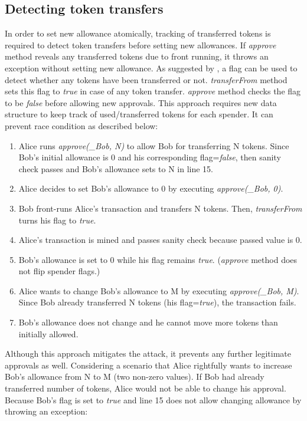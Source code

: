 \subsection{Detecting token transfers}
In order to set new allowance atomically, tracking of transferred tokens is required to detect token transfers before setting new allowances. If \textit{approve} method reveals any transferred tokens due to front running, it throws an exception without setting new allowance. As suggested by \cite{Ref17}, a flag can be used to detect whether any tokens have been transferred or not. \textit{transferFrom} method sets this flag to \textit{true} in case of any token transfer. \textit{approve} method checks the flag to be \textit{false} before allowing new approvals. This approach requires new data structure to keep track of used/transferred tokens for each spender. It can prevent race condition as described below:
\begin{enumerate}
	\item Alice runs \textit{approve(\_Bob, N)} to allow Bob for transferring N tokens. Since Bob’s initial allowance is 0 and his corresponding flag=\textit{false}, then sanity check passes and Bob’s allowance sets to N in line 15.
	\item Alice decides to set Bob’s allowance to 0 by executing \textit{approve(\_Bob, 0)}.
	\item Bob front-runs Alice’s transaction and transfers N tokens. Then, \textit{transferFrom} turns his flag to \textit{true}.
	\item Alice’s transaction is mined and passes sanity check because passed value is 0.
	\item Bob’s allowance is set to 0 while his flag remains \textit{true}. (\textit{approve} method does not flip spender flags.)
	\item Alice wants to change Bob’s allowance to M by executing \textit{approve(\_Bob, M)}. Since Bob already transferred N tokens (his flag=\textit{true}), the transaction fails.
	\item Bob’s allowance does not change and he cannot move more tokens than initially allowed.\newline
\end{enumerate}
\noindent Although this approach mitigates the attack, it prevents any further legitimate approvals as well. Considering a scenario that Alice rightfully wants to increase Bob’s allowance from N to M (two non-zero values). If Bob had already transferred number of tokens, Alice would not be able to change his approval. Because Bob's flag is set to \textit{true} and line 15 does not allow changing allowance by throwing an exception:
